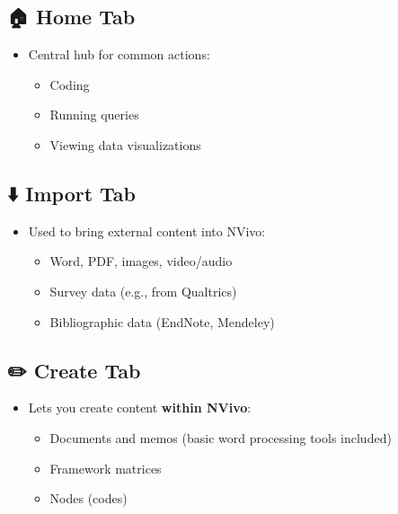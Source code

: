 \documentclass[
  letterpaper,
  DIV=11,
  numbers=noendperiod]{scrreprt}
\providecommand{\tightlist}{%
  \setlength{\itemsep}{0pt}\setlength{\parskip}{0pt}}\usepackage{longtable,booktabs,array}
\begin{document}
\subsection{🏠 Home Tab}\label{home-tab}

\begin{itemize}
\tightlist
\item
  Central hub for common actions:

  \begin{itemize}
  \tightlist
  \item
    Coding
  \item
    Running queries
  \item
    Viewing data visualizations
  \end{itemize}
\end{itemize}

\subsection{⬇️ Import Tab}\label{import-tab}

\begin{itemize}
\tightlist
\item
  Used to bring external content into NVivo:

  \begin{itemize}
  \tightlist
  \item
    Word, PDF, images, video/audio
  \item
    Survey data (e.g., from Qualtrics)
  \item
    Bibliographic data (EndNote, Mendeley)
  \end{itemize}
\end{itemize}

\subsection{✏️ Create Tab}\label{create-tab}

\begin{itemize}
\tightlist
\item
  Lets you create content \textbf{within NVivo}:

  \begin{itemize}
  \tightlist
  \item
    Documents and memos (basic word processing tools included)
  \item
    Framework matrices
  \item
    Nodes (codes)
  \end{itemize}
\end{itemize}
\end{document}
